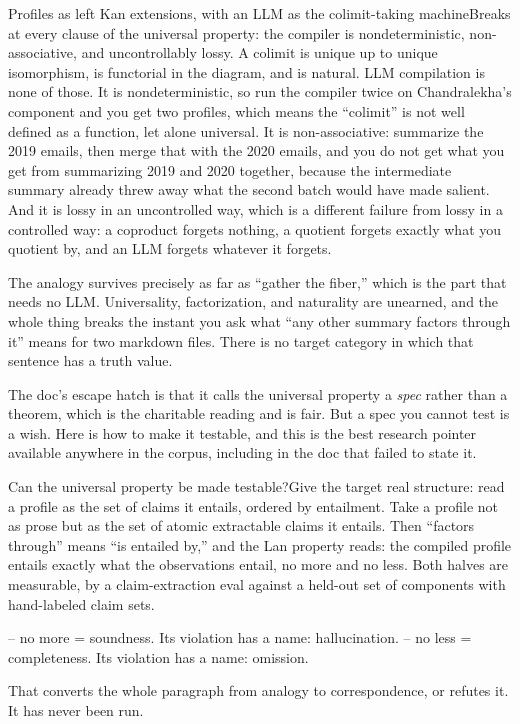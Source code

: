 \begin{Analogy}{Profiles as left Kan extensions, with an LLM as the colimit-taking machine}{Breaks at every clause of the universal property: the compiler is nondeterministic, non-associative, and uncontrollably lossy.}
A colimit is unique up to unique isomorphism, is functorial in the diagram, and is natural. LLM compilation is none of those. It is nondeterministic, so run the compiler twice on Chandralekha's component and you get two profiles, which means the ``colimit'' is not well defined as a function, let alone universal. It is non-associative: summarize the 2019 emails, then merge that with the 2020 emails, and you do not get what you get from summarizing 2019 and 2020 together, because the intermediate summary already threw away what the second batch would have made salient. And it is lossy in an uncontrolled way, which is a different failure from lossy in a controlled way: a coproduct forgets nothing, a quotient forgets exactly what you quotient by, and an LLM forgets whatever it forgets.

The analogy survives precisely as far as ``gather the fiber,'' which is the part that needs no LLM. Universality, factorization, and naturality are unearned, and the whole thing breaks the instant you ask what ``any other summary factors through it'' means for two markdown files. There is no target category in which that sentence has a truth value.
\end{Analogy}

The doc's escape hatch is that it calls the universal property a \emph{spec} rather than a theorem, which is the charitable reading and is fair. But a spec you cannot test is a wish. Here is how to make it testable, and this is the best research pointer available anywhere in the corpus, including in the doc that failed to state it.

\begin{Open}{Can the universal property be made testable?}{Give the target real structure: read a profile as the set of claims it entails, ordered by entailment.}
Take a profile not as prose but as the set of atomic extractable claims it entails. Then ``factors through'' means ``is entailed by,'' and the Lan property reads: the compiled profile entails exactly what the observations entail, no more and no less. Both halves are measurable, by a claim-extraction eval against a held-out set of components with hand-labeled claim sets.

\begin{Check}
-- no more  =  soundness.    Its violation has a name: hallucination.
-- no less  =  completeness. Its violation has a name: omission.
\end{Check}

That converts the whole paragraph from analogy to correspondence, or refutes it. It has never been run.
\end{Open}

